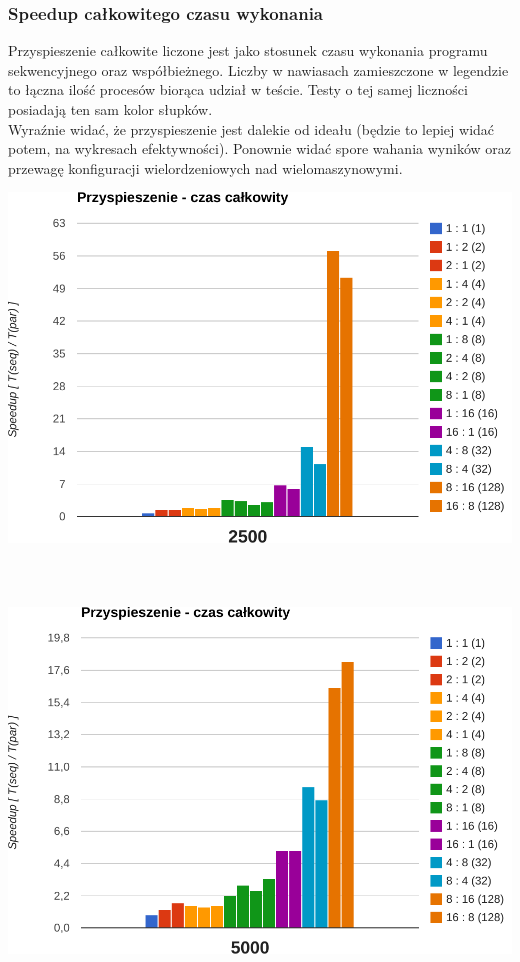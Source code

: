 \documentclass[paper=a4, fontsize=11pt]{scrartcl}	%
\numberwithin{equation}{section}		%
\numberwithin{figure}{section}			%
\numberwithin{table}{section}				%
\begin{document}
\subsubsection{Speedup całkowitego czasu wykonania}

Przyspieszenie całkowite liczone jest jako stosunek czasu wykonania programu
sekwencyjnego oraz współbieżnego. Liczby w nawiasach zamieszczone w legendzie to
łączna ilość procesów biorąca udział w teście. Testy o tej samej liczności
posiadają ten sam kolor słupków. \\

Wyraźnie widać, że przyspieszenie jest dalekie od ideału (będzie to lepiej widać
potem, na wykresach efektywności). Ponownie widać spore wahania wyników oraz
przewagę konfiguracji wielordzeniowych nad wielomaszynowymi.

\begin{center}

\includegraphics[width=135mm]{report/speedup-2500.pdf} \\ \ \\ \ \\ \ \\

\includegraphics[width=135mm]{report/speedup-5000.pdf} \\ \ \\ \ \\ \ \\


\end{center}
\end{document}
